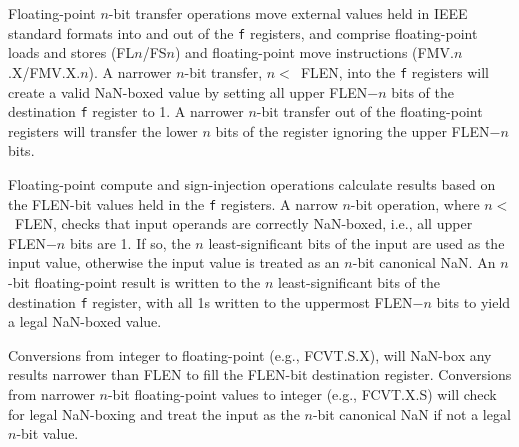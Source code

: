 Floating-point $n$-bit transfer operations move external values held
in IEEE standard formats into and out of the {\tt f} registers, and
comprise floating-point loads and stores (FL$n$/FS$n$) and
floating-point move instructions (FMV.$n$.X/FMV.X.$n$).  A narrower
$n$-bit transfer, \mbox{$n<$ FLEN}, into the {\tt f} registers will create a
valid NaN-boxed value by setting all upper FLEN$-n$ bits of the
destination {\tt f} register to 1.  A narrower $n$-bit transfer out of
the floating-point registers will transfer the lower $n$ bits of the
register ignoring the upper FLEN$-n$ bits.

Floating-point compute and sign-injection operations calculate results
based on the FLEN-bit values held in the {\tt f} registers.  A narrow
$n$-bit operation, where \mbox{$n<$ FLEN}, checks that input operands are
correctly NaN-boxed, i.e., all upper FLEN$-n$ bits are 1.  If so, the
$n$ least-significant bits of the input are used as the input value,
otherwise the input value is treated as an $n$-bit canonical NaN.  An
$n$-bit floating-point result is written to the $n$ least-significant
bits of the destination {\tt f} register, with all 1s written to the
uppermost FLEN$-n$ bits to yield a legal NaN-boxed value.

Conversions from integer to floating-point (e.g., FCVT.S.X), will
NaN-box any results narrower than FLEN to fill the FLEN-bit
destination register.  Conversions from narrower $n$-bit
floating-point values to integer (e.g., FCVT.X.S) will check for legal
NaN-boxing and treat the input as the $n$-bit canonical NaN if not a
legal $n$-bit value.


